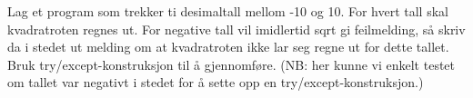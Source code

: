 %
%
Lag et program som trekker ti desimaltall mellom -10 og 10. For hvert tall skal kvadratroten regnes ut.
For negative tall vil imidlertid sqrt gi feilmelding, så skriv da i stedet ut melding om at kvadratroten ikke lar seg regne ut for dette tallet. Bruk try/except-konstruksjon til å gjennomføre. (NB: her kunne vi enkelt testet om tallet var negativt i stedet for å sette opp en try/except-konstruksjon.)
